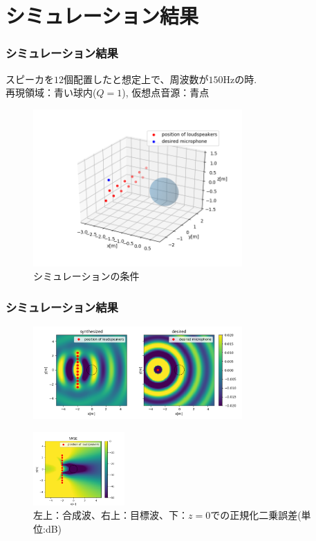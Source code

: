 \documentclass[uplatex,dvipdfmx,11pt,notheorems]{beamer}
\theoremstyle{definition}
\begin{document}
\section{シミュレーション結果}
\begin{frame}\frametitle{シミュレーション結果}
スピーカを$12$個配置したと想定上で、周波数が$150$Hzの時.\\
再現領域：青い球内($Q=1$), 仮想点音源：青点
    \begin{figure}[tb]
	\includegraphics[width=8cm,clip]{intersimu4.png}
	\caption{シミュレーションの条件}
	\end{figure}

 \end{frame}
 \begin{frame}\frametitle{シミュレーション結果}
    \begin{figure}[tb]
	\centering
	\includegraphics[width=8cm,clip]{intersimu1.png}
	\end{figure}
    \begin{figure}[tb]
	\includegraphics[width=3.5cm,clip]{intersimu2.png}
	\caption{左上：合成波、右上：目標波、下：$z=0$での正規化二乗誤差(単位:dB)}
	\end{figure}
 \end{frame}
\end{document}
